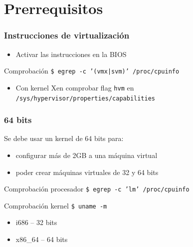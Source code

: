 \documentclass{beamer}
\begin{document}






\section{Prerrequisitos}

\begin{frame}
  \frametitle{Instrucciones de virtualización}
  \begin{itemize}
    \item Activar las instrucciones en la BIOS
  \end{itemize}
  \bigskip
  \begin{block}{Comprobación}
    \texttt{\$ egrep -c '(vmx|svm)' /proc/cpuinfo}
  \end{block}
  \bigskip
  \begin{itemize}
    \item Con kernel Xen comprobar flag \texttt{hvm} en \texttt{/sys/hypervisor/properties/capabilities}
  \end{itemize}
\end{frame}

\begin{frame}
  \frametitle{64 bits}
  Se debe usar un kernel de 64 bits para:
  \begin{itemize}
    \item configurar más de 2GB a una máquina virtual
    \item poder crear máquinas virtuales de 32 y 64 bits
  \end{itemize}
  \begin{block}{Comprobación procesador}
    \texttt{\$ egrep -c 'lm' /proc/cpuinfo}
  \end{block}
  \begin{block}{Comprobación kernel}
    \texttt{\$ uname -m}
    \begin{itemize}
      \item i686 -- 32 bits
      \item x86\_64 -- 64 bits
    \end{itemize}
  \end{block}
\end{frame}
\end{document}
